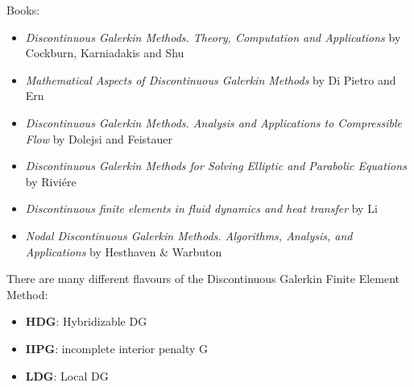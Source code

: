 
Books:

\begin{itemize}
\item {\it Discontinuous Galerkin Methods. Theory, Computation and Applications} by
Cockburn, Karniadakis and Shu \cite{cockburn00}
\item {\it Mathematical Aspects of Discontinuous Galerkin Methods} by Di Pietro and Ern 
\cite{dipietro_ern12}
\item {\it Discontinuous Galerkin Methods. Analysis and Applications to Compressible Flow} by 
Dolejsi and Feistauer \cite{dolejsi_feistauer15}
\item {\it Discontinuous Galerkin Methods for Solving Elliptic and Parabolic Equations} by Rivi{\'e}re
\cite{riviere08}
\item {\it Discontinuous finite elements in fluid dynamics and heat transfer} by Li \cite{li06}
\item {\it Nodal Discontinuous Galerkin Methods. Algorithms, Analysis, and Applications} by 
Hesthaven \& Warbuton \cite{hewa08}
\end{itemize}


There are many different flavours of the Discontinuous Galerkin Finite Element Method:
\begin{itemize}
\item {\bf HDG}: Hybridizable DG \cite{conp10}
\item {\bf IIPG}: incomplete interior penalty G  \cite{dole08}
\item {\bf LDG}: Local DG \cite{cacp02}  
\end{itemize}
